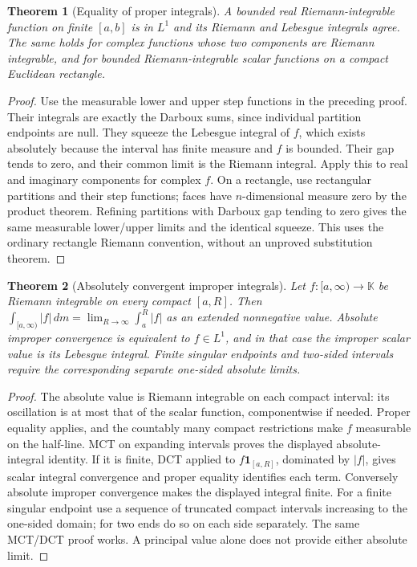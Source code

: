 \documentclass[11pt,oneside,openany]{book}
\newtheorem{theorem}{Theorem}[chapter]
\theoremstyle{definition}
\theoremstyle{remark}
\newcommand{\one}{\mathbf1}\newcommand{\ind}[1]{\mathbf1_{#1}}
\newcommand{\family}[1]{}
\begin{document}
\begin{theorem}[Equality of proper integrals]\family{D11.16.proper_integral_equality}\label{d11:16:proper-integral-equality}
A bounded real Riemann-integrable function on finite $[a,b]$ is in
$L^1$ and its Riemann and Lebesgue integrals agree. The same holds for
complex functions whose two components are Riemann integrable, and for
bounded Riemann-integrable scalar functions on a compact Euclidean rectangle.
\end{theorem}
\begin{proof}
Use the measurable lower and upper step functions in the preceding proof.
Their integrals are exactly the Darboux sums, since individual partition
endpoints are null. They squeeze the Lebesgue integral of $f$, which
exists absolutely because the interval has finite measure and $f$ is
bounded. Their gap tends to zero, and their common limit is the Riemann
integral. Apply this to real and imaginary components for complex $f$.
On a rectangle, use rectangular partitions and their step functions;
faces have $n$-dimensional measure zero by the product theorem. Refining
partitions with Darboux gap tending to zero gives the same measurable
lower/upper limits and the identical squeeze. This uses the ordinary
rectangle Riemann convention, without an unproved substitution theorem.
\end{proof}

\begin{theorem}[Absolutely convergent improper integrals]\family{D11.16.absolute_improper_bridge}\label{d11:16:absolute-improper-bridge}
Let $f:[a,\infty)\to\mathbb K$ be Riemann integrable on every compact
$[a,R]$. Then
$\int_{[a,\infty)}|f|\,dm=\lim_{R\to\infty}\int_a^R|f|$ as an
extended nonnegative value. Absolute improper convergence is equivalent
to $f\in L^1$, and in that case the improper scalar value is its Lebesgue
integral. Finite singular endpoints and two-sided intervals require the
corresponding separate one-sided absolute limits.
\end{theorem}
\begin{proof}
The absolute value is Riemann integrable on each compact interval: its
oscillation is at most that of the scalar function, componentwise if
needed. Proper equality applies, and the countably many compact
restrictions make $f$ measurable on the half-line. MCT on expanding
intervals proves the displayed absolute-integral identity. If it is
finite, DCT applied to $f\one_{[a,R]}$, dominated by $|f|$, gives scalar
integral convergence and proper equality identifies each term. Conversely
absolute improper convergence makes the displayed integral finite.
For a finite singular endpoint use a sequence of truncated compact
intervals increasing to the one-sided domain; for two ends do so on each
side separately. The same MCT/DCT proof works. A principal value alone
does not provide either absolute limit.
\end{proof}
\end{document}
